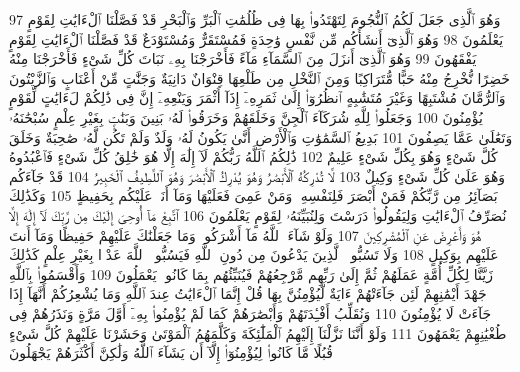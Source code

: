 {\tiny\colorbox{cl_aya}{97}} وَهُوَ ٱلَّذِى جَعَلَ لَكُمُ ٱلنُّجُومَ لِتَهْتَدُوا۟ بِهَا فِى ظُلُمَٰتِ ٱلْبَرِّ وَٱلْبَحْرِ قَدْ فَصَّلْنَا ٱلْءَايَٰتِ لِقَوْمٍ يَعْلَمُونَ
{\tiny\colorbox{cl_aya}{98}} وَهُوَ ٱلَّذِىٓ أَنشَأَكُم مِّن نَّفْسٍ وَٰحِدَةٍ فَمُسْتَقَرٌّ وَمُسْتَوْدَعٌ قَدْ فَصَّلْنَا ٱلْءَايَٰتِ لِقَوْمٍ يَفْقَهُونَ
{\tiny\colorbox{cl_aya}{99}} وَهُوَ ٱلَّذِىٓ أَنزَلَ مِنَ ٱلسَّمَآءِ مَآءً فَأَخْرَجْنَا بِهِۦ نَبَاتَ كُلِّ شَىْءٍ فَأَخْرَجْنَا مِنْهُ خَضِرًا نُّخْرِجُ مِنْهُ حَبًّا مُّتَرَاكِبًا وَمِنَ ٱلنَّخْلِ مِن طَلْعِهَا قِنْوَانٌ دَانِيَةٌ وَجَنَّٰتٍ مِّنْ أَعْنَابٍ وَٱلزَّيْتُونَ وَٱلرُّمَّانَ مُشْتَبِهًا وَغَيْرَ مُتَشَٰبِهٍ ٱنظُرُوٓا۟ إِلَىٰ ثَمَرِهِۦٓ إِذَآ أَثْمَرَ وَيَنْعِهِۦٓ إِنَّ فِى ذَٰلِكُمْ لَءَايَٰتٍ لِّقَوْمٍ يُؤْمِنُونَ
{\tiny\colorbox{cl_aya}{100}} وَجَعَلُوا۟ لِلَّهِ شُرَكَآءَ ٱلْجِنَّ وَخَلَقَهُمْ وَخَرَقُوا۟ لَهُۥ بَنِينَ وَبَنَٰتٍۭ بِغَيْرِ عِلْمٍ سُبْحَٰنَهُۥ وَتَعَٰلَىٰ عَمَّا يَصِفُونَ
{\tiny\colorbox{cl_aya}{101}} بَدِيعُ ٱلسَّمَٰوَٰتِ وَٱلْأَرْضِ أَنَّىٰ يَكُونُ لَهُۥ وَلَدٌ وَلَمْ تَكُن لَّهُۥ صَٰحِبَةٌ وَخَلَقَ كُلَّ شَىْءٍ وَهُوَ بِكُلِّ شَىْءٍ عَلِيمٌ
{\tiny\colorbox{cl_aya}{102}} ذَٰلِكُمُ ٱللَّهُ رَبُّكُمْ لَآ إِلَٰهَ إِلَّا هُوَ خَٰلِقُ كُلِّ شَىْءٍ فَٱعْبُدُوهُ وَهُوَ عَلَىٰ كُلِّ شَىْءٍ وَكِيلٌ
{\tiny\colorbox{cl_aya}{103}} لَّا تُدْرِكُهُ ٱلْأَبْصَٰرُ وَهُوَ يُدْرِكُ ٱلْأَبْصَٰرَ وَهُوَ ٱللَّطِيفُ ٱلْخَبِيرُ
{\tiny\colorbox{cl_aya}{104}} قَدْ جَآءَكُم بَصَآئِرُ مِن رَّبِّكُمْ فَمَنْ أَبْصَرَ فَلِنَفْسِهِۦ وَمَنْ عَمِىَ فَعَلَيْهَا وَمَآ أَنَا۠ عَلَيْكُم بِحَفِيظٍ
{\tiny\colorbox{cl_aya}{105}} وَكَذَٰلِكَ نُصَرِّفُ ٱلْءَايَٰتِ وَلِيَقُولُوا۟ دَرَسْتَ وَلِنُبَيِّنَهُۥ لِقَوْمٍ يَعْلَمُونَ
{\tiny\colorbox{cl_aya}{106}} ٱتَّبِعْ مَآ أُوحِىَ إِلَيْكَ مِن رَّبِّكَ لَآ إِلَٰهَ إِلَّا هُوَ وَأَعْرِضْ عَنِ ٱلْمُشْرِكِينَ
{\tiny\colorbox{cl_aya}{107}} وَلَوْ شَآءَ ٱللَّهُ مَآ أَشْرَكُوا۟ وَمَا جَعَلْنَٰكَ عَلَيْهِمْ حَفِيظًا وَمَآ أَنتَ عَلَيْهِم بِوَكِيلٍ
{\tiny\colorbox{cl_aya}{108}} وَلَا تَسُبُّوا۟ ٱلَّذِينَ يَدْعُونَ مِن دُونِ ٱللَّهِ فَيَسُبُّوا۟ ٱللَّهَ عَدْوًۢا بِغَيْرِ عِلْمٍ كَذَٰلِكَ زَيَّنَّا لِكُلِّ أُمَّةٍ عَمَلَهُمْ ثُمَّ إِلَىٰ رَبِّهِم مَّرْجِعُهُمْ فَيُنَبِّئُهُم بِمَا كَانُوا۟ يَعْمَلُونَ
{\tiny\colorbox{cl_aya}{109}} وَأَقْسَمُوا۟ بِٱللَّهِ جَهْدَ أَيْمَٰنِهِمْ لَئِن جَآءَتْهُمْ ءَايَةٌ لَّيُؤْمِنُنَّ بِهَا قُلْ إِنَّمَا ٱلْءَايَٰتُ عِندَ ٱللَّهِ وَمَا يُشْعِرُكُمْ أَنَّهَآ إِذَا جَآءَتْ لَا يُؤْمِنُونَ
{\tiny\colorbox{cl_aya}{110}} وَنُقَلِّبُ أَفْـِٔدَتَهُمْ وَأَبْصَٰرَهُمْ كَمَا لَمْ يُؤْمِنُوا۟ بِهِۦٓ أَوَّلَ مَرَّةٍ وَنَذَرُهُمْ فِى طُغْيَٰنِهِمْ يَعْمَهُونَ
{\tiny\colorbox{cl_aya}{111}} وَلَوْ أَنَّنَا نَزَّلْنَآ إِلَيْهِمُ ٱلْمَلَٰٓئِكَةَ وَكَلَّمَهُمُ ٱلْمَوْتَىٰ وَحَشَرْنَا عَلَيْهِمْ كُلَّ شَىْءٍ قُبُلًا مَّا كَانُوا۟ لِيُؤْمِنُوٓا۟ إِلَّآ أَن يَشَآءَ ٱللَّهُ وَلَٰكِنَّ أَكْثَرَهُمْ يَجْهَلُونَ
